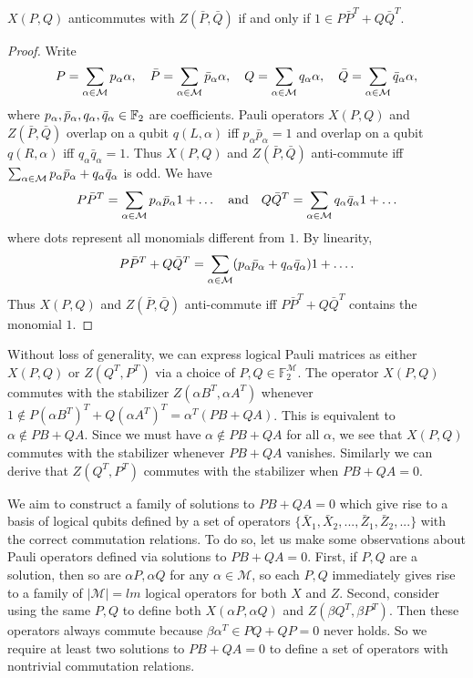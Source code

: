 \documentclass{article}
\begin{document}
\begin{lemma} $X(P,Q)$ anticommutes with $Z(\bar P,\bar Q)$ if and only if $1 \in P\bar P^T + Q\bar Q^T$.
\end{lemma}
\begin{proof}
Write 
\[
P=\sum_{\alpha\in {\cal M }} p_\alpha \alpha,
\quad 
\bar{P}=\sum_{\alpha\in {\cal M }} \bar{p}_\alpha \alpha,
\quad
Q=\sum_{\alpha\in {\cal M }} q_\alpha \alpha,
\quad
\bar{Q}=\sum_{\alpha\in {\cal M }} \bar{q}_\alpha \alpha,
\]
where  $p_\alpha,\bar{p}_\alpha,q_\alpha,\bar{q}_\alpha\in \mathbb{F}_2$ are coefficients.
Pauli operators $X(P,Q)$ and $Z(\bar{P},\bar{Q})$ overlap on a qubit
$q(L,\alpha)$  iff $p_\alpha \bar{p}_\alpha=1$
and overlap on a qubit $q(R,\alpha)$ iff $q_\alpha\bar{q}_\alpha=1$.
Thus  $X(P,Q)$ and $Z(\bar{P},\bar{Q})$ anti-commute
iff  $\sum_{\alpha \in {\cal M }} p_\alpha \bar{p}_\alpha + q_\alpha \bar{q}_\alpha$
is odd. 
We have 
\[
P\bar{P}^T = \sum_{\alpha \in {\cal M }} p_\alpha \bar{p}_\alpha 1 + \ldots
\quad \mbox{and} \quad
Q\bar{Q}^T =  \sum_{\alpha \in {\cal M }} q_\alpha \bar{q}_\alpha 1 + \ldots
\]
where dots represent all monomials different from $1$. By linearity,
\[
P\bar{P}^T + Q\bar{Q}^T
=\sum_{\alpha \in {\cal M }}
(p_\alpha \bar{p}_\alpha
+q_\alpha \bar{q}_\alpha)1+\ldots.
\]
Thus $X(P,Q)$ and $Z(\bar{P},\bar{Q})$ anti-commute
iff $P\bar{P}^T + Q\bar{Q}^T$ contains the monomial $1$.
\end{proof}


Without loss of generality, we can express logical Pauli matrices as either $X(P,Q)$ or $Z(Q^T, P^T)$ via a choice of $P,Q \in \mathbb{F}_2^{\mathcal{M}}$. The operator $X(P,Q)$ commutes with the stabilizer $Z(\alpha B^T, \alpha A^T)$ whenever $1 \not\in P(\alpha B^T)^T + Q (\alpha A^T)^T = \alpha^T (PB + QA) $. This is equivalent to $\alpha \not\in PB + QA$. Since we must have $\alpha \not\in PB + QA$ for all $\alpha$, we see that $X(P,Q)$ commutes with the stabilizer whenever $PB + QA$ vanishes. Similarly we can derive that $Z(Q^T, P^T)$ commutes with the stabilizer when $PB + QA = 0$. 

We aim to construct a family of solutions to $PB + QA = 0$ which give rise to a basis of logical qubits defined by a set of operators $\{\bar X_1, \bar X_2, ..., \bar Z_1, \bar Z_2, ... \}$ with the correct commutation relations.  To do so, let us make some observations about Pauli operators defined via solutions to $PB + QA = 0$. First, if $P,Q$ are a solution, then so are $\alpha P, \alpha Q$ for any $\alpha \in \mathcal{M}$, so each $P,Q$ immediately gives rise to a family of $|\mathcal{M}| = lm$ logical operators for both $X$ and $Z$. Second, consider using the same $P,Q$ to define both $X(\alpha P, \alpha Q)$  and $Z(\beta Q^T, \beta P^T)$. Then these operators always commute because $\beta \alpha^T \in PQ + QP = 0$ never holds. So we require at least two solutions to $PB+QA = 0$ to define a set of operators with nontrivial commutation relations. 
\end{document}
